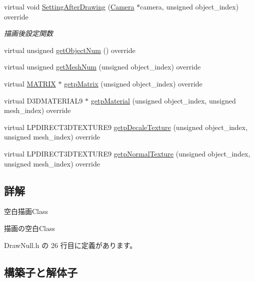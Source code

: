 \begin{DoxyCompactItemize}
virtual void \mbox{\hyperlink{class_draw_null_a76edfc5af0bf3275f96f40394aff8510}{Setting\+After\+Drawing}} (\mbox{\hyperlink{class_camera}{Camera}} $\ast$camera, unsigned object\+\_\+index) override
\begin{DoxyCompactList}\small\item\em 描画後設定関数 \end{DoxyCompactList}\item 
virtual unsigned \mbox{\hyperlink{class_draw_null_ae71c0b03f98748a4eb1d2e2635bcc146}{get\+Object\+Num}} () override
\item 
virtual unsigned \mbox{\hyperlink{class_draw_null_a7586cc78eed6bcaf2972ad7a6a70e665}{get\+Mesh\+Num}} (unsigned object\+\_\+index) override
\item 
virtual \mbox{\hyperlink{_vector3_d_8h_a032295cd9fb1b711757c90667278e744}{M\+A\+T\+R\+IX}} $\ast$ \mbox{\hyperlink{class_draw_null_a001901c340671106a33d44b9d4aef4c4}{getp\+Matrix}} (unsigned object\+\_\+index) override
\item 
virtual D3\+D\+M\+A\+T\+E\+R\+I\+A\+L9 $\ast$ \mbox{\hyperlink{class_draw_null_aa07d7e89e723b68ec257da0f63d43f70}{getp\+Material}} (unsigned object\+\_\+index, unsigned mesh\+\_\+index) override
\item 
virtual L\+P\+D\+I\+R\+E\+C\+T3\+D\+T\+E\+X\+T\+U\+R\+E9 \mbox{\hyperlink{class_draw_null_a2dfa2d2cbb66249f933420a38e9cadad}{getp\+Decale\+Texture}} (unsigned object\+\_\+index, unsigned mesh\+\_\+index) override
\item 
virtual L\+P\+D\+I\+R\+E\+C\+T3\+D\+T\+E\+X\+T\+U\+R\+E9 \mbox{\hyperlink{class_draw_null_a3b51dfd629853a461cc50175de94ee03}{getp\+Normal\+Texture}} (unsigned object\+\_\+index, unsigned mesh\+\_\+index) override
\end{DoxyCompactItemize}


\subsection{詳解}
空白描画\+Class 

描画の空白\+Class 

 Draw\+Null.\+h の 26 行目に定義があります。



\subsection{構築子と解体子}
\mbox{\label{class_draw_null_aa085e175e9e05fc56cb4aefa2d07f371}} 
